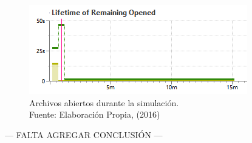 \begin{figure}[H]
        \centering
        \captionsetup{justification=centering}
        \includegraphics[scale=1.2]{images/FileOpenedClosed.png}
        \caption[Archivos abiertos durante la simulación.]{Archivos abiertos durante la simulación.\\Fuente: Elaboración Propia, (2016)}
        \label{fig:fileOpenClose}
\end{figure}

--- FALTA AGREGAR CONCLUSIÓN ---


